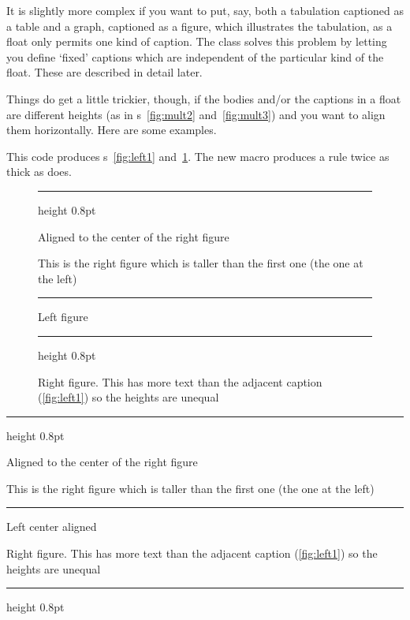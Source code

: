     It is slightly more complex if you want to put, say, both a 
tabulation captioned as a table and a graph, captioned as a figure, 
which illustrates the tabulation, as a 
float 
only permits one kind of caption. The class solves this problem by 
letting you define `fixed' captions which are
independent of the particular kind of the float. These are described in 
detail later.

    Things do get a little trickier, though, if the bodies and/or
the captions in a float are different heights 
(as in \figurerefname s~\ref{fig:mult2} and~\ref{fig:mult3}) 
and you want to align them horizontally.
Here are some examples.


    This code produces \figurerefname s~\ref{fig:left1} 
and~\ref{fig:right1}. The new \cmd{\hhrule} macro produces a rule
twice as thick as \cmd{\hrule} does.
\begin{lcode}
\newcommand*{\hhrule}{\hrule height 0.8pt}%

\begin{figure}
\hhrule \vspace{\onelineskip}
\null\hfill\parbox{0.45\linewidth}{%
  \centering
  Aligned to the center of the right figure
}\hfill
\parbox{0.45\linewidth}{%
  \centering
   This is the right figure which is taller
   than the first one (the one at the left)
}\hfill\null
\vspace{\onelineskip}\hrule
\null\hfill\parbox[t]{0.4\linewidth}{%
  \caption{Left figure}\label{fig:left1}%
}\hfill
\parbox[t]{0.4\linewidth}{%
  \caption{Right figure. This has more text than the adjacent
           caption (\ref{fig:left1}) so the heights are unequal}%
           \label{fig:right1}%
}\hfill\null
\hhrule
\end{figure}
\end{lcode}

\newcommand*{\hhrule}{\hrule height 0.8pt}%

\begin{shadefigure}
\hhrule \vspace{\onelineskip}
\null\hfill\parbox{0.45\linewidth}{%
  \centering
  Aligned to the center of the right figure
}\hfill
\parbox{0.45\linewidth}{%
  \centering
   This is the right figure which is taller
   than the first one (the one at the left)
}\hfill\null
\vspace{\onelineskip}\hrule
\null\hfill\parbox[t]{0.4\linewidth}{%
  \caption{Left center aligned}\label{fig:left1}%
}\hfill
\parbox[t]{0.4\linewidth}{%
  \caption{Right figure. This has more text than the adjacent
           caption (\ref{fig:left1}) so the heights are unequal}%
           \label{fig:right1}%
}\hfill\null
\hhrule
\end{shadefigure}


